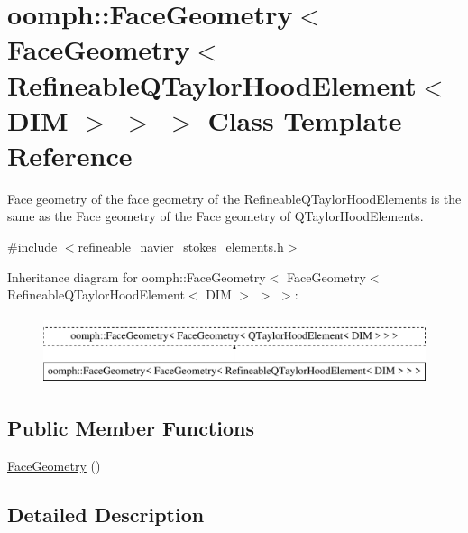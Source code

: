 \hypertarget{classoomph_1_1FaceGeometry_3_01FaceGeometry_3_01RefineableQTaylorHoodElement_3_01DIM_01_4_01_4_01_4}{}\section{oomph\+:\+:Face\+Geometry$<$ Face\+Geometry$<$ Refineable\+Q\+Taylor\+Hood\+Element$<$ D\+IM $>$ $>$ $>$ Class Template Reference}
\label{classoomph_1_1FaceGeometry_3_01FaceGeometry_3_01RefineableQTaylorHoodElement_3_01DIM_01_4_01_4_01_4}


Face geometry of the face geometry of the Refineable\+Q\+Taylor\+Hood\+Elements is the same as the Face geometry of the Face geometry of Q\+Taylor\+Hood\+Elements.  




{\ttfamily \#include $<$refineable\+\_\+navier\+\_\+stokes\+\_\+elements.\+h$>$}

Inheritance diagram for oomph\+:\+:Face\+Geometry$<$ Face\+Geometry$<$ Refineable\+Q\+Taylor\+Hood\+Element$<$ D\+IM $>$ $>$ $>$\+:\begin{figure}[H]
\begin{center}
\leavevmode
\includegraphics[height=2.000000cm]{classoomph_1_1FaceGeometry_3_01FaceGeometry_3_01RefineableQTaylorHoodElement_3_01DIM_01_4_01_4_01_4}
\end{center}
\end{figure}
\subsection*{Public Member Functions}
\begin{DoxyCompactItemize}
\item 
\hyperlink{classoomph_1_1FaceGeometry_3_01FaceGeometry_3_01RefineableQTaylorHoodElement_3_01DIM_01_4_01_4_01_4_ab4a9f36558b0394a30703106988a54d3}{Face\+Geometry} ()
\end{DoxyCompactItemize}


\subsection{Detailed Description}
